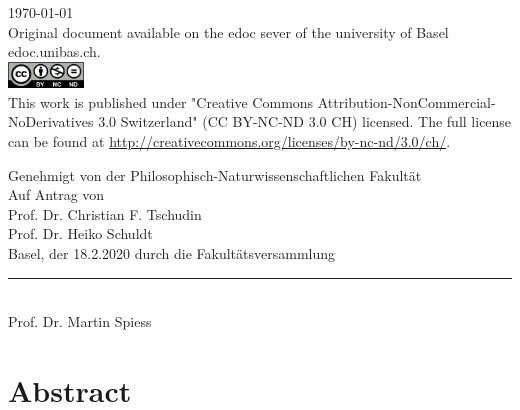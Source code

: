 \begin{titlepage}
\begin{center}
\vfill
{\large \today\\[1cm]}
{\footnotesize Original document available on the edoc sever of the university of Basel edoc.unibas.ch.\\[0.5cm]
\includegraphics[height=7mm]{./inc/cclic.png}~\\[0.5cm]
This work is published under  "Creative Commons Attribution-NonCommercial-NoDerivatives 3.0 Switzerland" (CC BY-NC-ND 3.0 CH) licensed. The full license can be found at \url{http://creativecommons.org/licenses/by-nc-nd/3.0/ch/}.
}

\end{center}
\end{titlepage}

\restoregeometry
\onecolumn
\clearpage\pagestyle{plain}

\begin{center}

Genehmigt von der Philosophisch-Naturwissenschaftlichen Fakult\"at\\
Auf Antrag von\\[0.5cm]
Prof. Dr. Christian F. Tschudin\\Prof. Dr. Heiko Schuldt\\[0.5cm]

Basel, der 18.2.2020 durch die Fakult\"atsversammlung\\[2cm]
{\rule{6cm}{0.2pt}\\ Prof. Dr. Martin Spiess}
\end{center}
\vfill\twocolumn



\section*{Abstract}   
  
\myabstract





